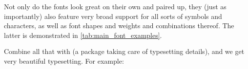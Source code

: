 Not only do the fonts look great on their own and paired up, they (just as importantly)
also feature very broad support for all sorts of symbols and characters, as well as font
shapes and weights and combinations thereof.
The latter is demonstrated in \cref{tab:main_font_examples}.
%
\begin{table}\ContinuedFloat*
\end{table}

Combine all that with  (a package taking care of typesetting
details), and we get very beautiful typesetting.
For example:

